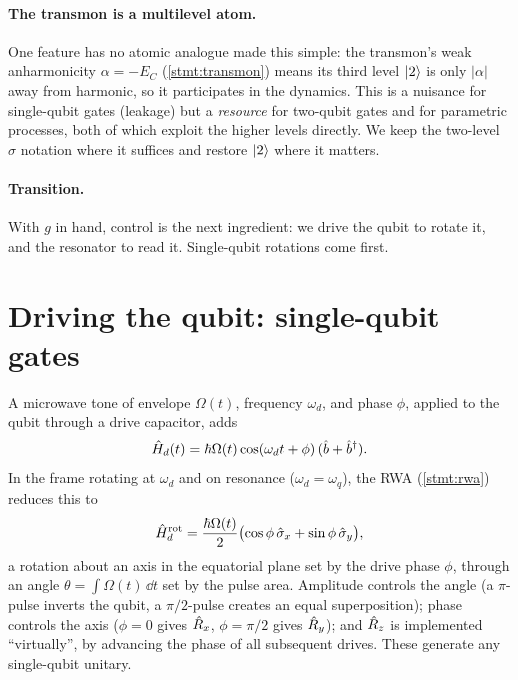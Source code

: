 \paragraph{The transmon is a multilevel atom.}
One feature has no atomic analogue made this simple: the transmon's
weak anharmonicity $\alpha=-E_C$ (\cref{stmt:transmon}) means its third
level $\ket2$ is only $|\alpha|$ away from harmonic, so it participates
in the dynamics. This is a nuisance for single-qubit gates (leakage)
but a \emph{resource} for two-qubit gates and for parametric processes,
both of which exploit the higher levels directly. We keep the
two-level $\hat\sigma$ notation where it suffices and restore $\ket2$
where it matters.

\paragraph{Transition.}
With $g$ in hand, control is the next ingredient: we drive the qubit
to rotate it, and the resonator to read it. Single-qubit rotations come
first.

\section{Driving the qubit: single-qubit gates}
\label{sec:single-qubit-gates}

\begin{statement}
\label{stmt:single-qubit-gates}
A microwave tone of envelope $\Omega(t)$, frequency $\omega_d$, and
phase $\phi$, applied to the qubit through a drive capacitor, adds
\begin{equation}
\label{eq:drive-hamiltonian}
\hat{H}_d(t) = \hbar\Omega(t)\cos(\omega_d t+\phi)\,(\hat b+\hat b^\dagger).
\end{equation}
In the frame rotating at $\omega_d$ and on resonance
($\omega_d=\omega_q$), the RWA (\cref{stmt:rwa}) reduces this to
\begin{equation}
\label{eq:rotating-frame-drive}
\hat{H}_d^{\rm rot} = \frac{\hbar\Omega(t)}{2}\bigl(\cos\phi\,\hat\sigma_x + \sin\phi\,\hat\sigma_y\bigr),
\end{equation}
a rotation about an axis in the equatorial plane set by the drive phase
$\phi$, through an angle $\theta=\int\Omega(t)\,\dd t$ set by the pulse
area. Amplitude controls the angle (a $\pi$-pulse inverts the qubit, a
$\pi/2$-pulse creates an equal superposition); phase controls the axis
($\phi=0$ gives $\hat{R}_x$, $\phi=\pi/2$ gives $\hat{R}_y$); and $\hat{R}_z$
is implemented ``virtually'', by advancing the phase of all subsequent
drives. These generate any single-qubit unitary.
\end{statement}

